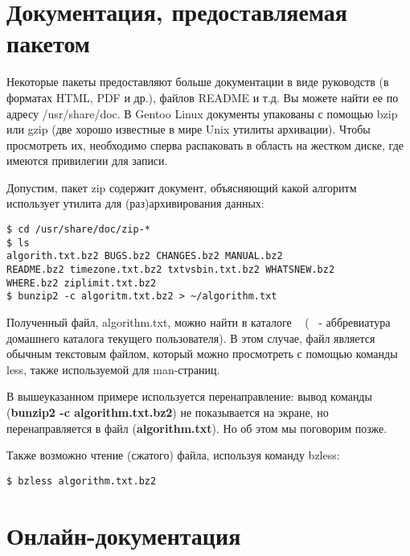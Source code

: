 \documentclass[12pt]{book}
\begin{document}
\section{Документация, предоставляемая пакетом}

Некоторые пакеты предоставляют больше документации в виде руководств (в форматах HTML, PDF и др.), файлов README и т.д. Вы можете найти ее по адресу /usr/share/doc. В Gentoo Linux документы упакованы с помощью bzip или gzip (две хорошо известные в мире Unix утилиты архивации). Чтобы  просмотреть их, необходимо сперва распаковать в область на жестком диске, где имеются привилегии для записи.

Допустим, пакет zip содержит документ, объясняющий какой алгоритм использует утилита для (раз)архивирования данных:

\vspace{3mm}
\begin{tcolorbox}
\begin{lstlisting}
$ cd /usr/share/doc/zip-*
$ ls
algorith.txt.bz2 BUGS.bz2 CHANGES.bz2 MANUAL.bz2
README.bz2 timezone.txt.bz2 txtvsbin.txt.bz2 WHATSNEW.bz2
WHERE.bz2 ziplimit.txt.bz2
$ bunzip2 -c algoritm.txt.bz2 > ~/algorithm.txt
\end{lstlisting}
\end{tcolorbox}

Полученный файл, algorithm.txt, можно найти в каталоге ~ (~ - аббревиатура домашнего каталога текущего пользователя). В этом случае, файл является обычным текстовым файлом, который можно просмотреть с помощью команды less, также используемой для man-страниц.

В вышеуказанном примере используется перенаправление: вывод команды  (\textbf{bunzip2 -c algorithm.txt.bz2}) не показывается на экране, но перенаправляется в файл (\textbf{algorithm.txt}). Но об этом мы поговорим позже.

Также возможно чтение (сжатого) файла, используя команду bzless:

\vspace{3mm}
\begin{tcolorbox}
\begin{lstlisting}
$ bzless algorithm.txt.bz2
\end{lstlisting}
\end{tcolorbox}

\section{Онлайн-документация}
\end{document}
